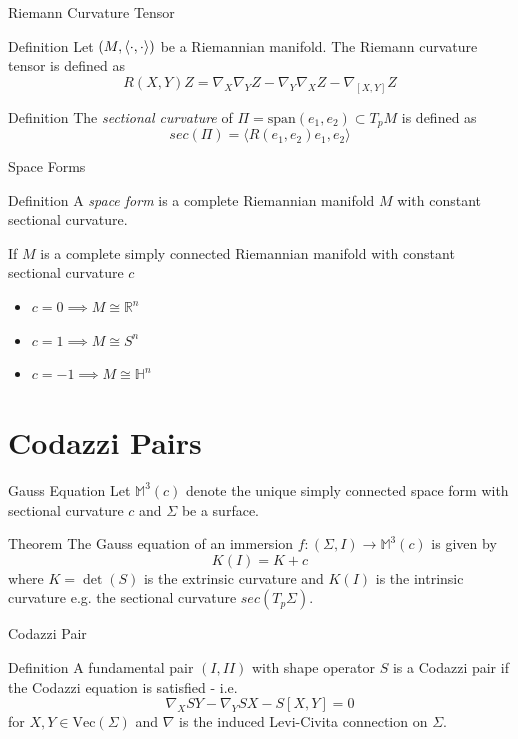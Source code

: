 \begin{frame}[c]{Riemann Curvature Tensor}
	\begin{kulblock}{Definition}
		Let $(M,\langle \cdot, \cdot \rangle)$ be a Riemannian manifold. The Riemann curvature tensor is defined as
		$$ R(X,Y)Z = \nabla_X \nabla_Y Z - \nabla_Y \nabla_X Z - \nabla_{[X,Y]} Z$$
	\end{kulblock}
	\begin{kulblock}{Definition}
		The \emph{sectional curvature} of $\Pi =\text{span}(e_1,e_2) \subset T_pM$ is defined as
		$$sec(\Pi) = \langle R(e_1, e_2)e_1, e_2 \rangle$$
	\end{kulblock}
\end{frame}

\begin{frame}[c]{Space Forms}
	\begin{kulblock}{Definition}
		A \emph{space form} is a complete Riemannian manifold $M$ with constant sectional curvature.
	\end{kulblock}
	\pause
	\begin{remark}
		If $M$ is a complete simply connected Riemannian manifold with constant sectional curvature $c$
		\begin{itemize}
			\item $c=0 \implies M \cong \mathbb{R}^n$
			\item $c = 1 \implies M \cong S^n$
			\item $ c = -1 \implies M \cong \mathbb{H}^n$
		\end{itemize}
	\end{remark}
\end{frame}

\section{Codazzi Pairs}
\frame[c]{\sectionpage}
\begin{frame}[c]{Gauss Equation}
	Let $\mathbb{M}^3(c)$ denote the unique simply connected space form with sectional curvature $c$ and $\Sigma$ be a surface.
	\pause
	\begin{kulblock}{Theorem}
		The Gauss equation of an immersion $f: (\Sigma,I) \to \mathbb{M}^3(c)$ is given by
		$$K(I) = K + c$$
		where $K = \det(S)$ is the extrinsic curvature and $K(I)$ is the intrinsic curvature e.g. the sectional curvature $sec(T_p\Sigma)$.
	\end{kulblock}
\end{frame}

\begin{frame}[c]{Codazzi Pair}
	\begin{kulblock}{Definition}
		A fundamental pair $(I, II)$ with shape operator $S$ is a Codazzi pair if the Codazzi equation is satisfied - i.e.
		$$\nabla_X SY - \nabla_Y SX - S[X, Y] = 0$$
		for $X,Y \in \text{Vec}(\Sigma)$ and $\nabla$ is the induced Levi-Civita connection on $\Sigma$.
	\end{kulblock}
\end{frame}

